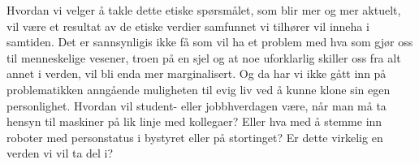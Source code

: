 Hvordan vi velger å takle dette etiske spørsmålet, som blir mer og mer aktuelt, vil være et resultat av de etiske verdier samfunnet vi tilhører vil inneha i samtiden. Det er sannsynligis ikke få som vil ha et problem med hva som gjør oss til menneskelige vesener, troen på en sjel og at noe uforklarlig skiller oss fra alt annet i verden, vil bli enda mer marginalisert. Og da har vi ikke gått inn på problematikken anngående muligheten til evig liv ved å kunne klone sin egen personlighet.
Hvordan vil student- eller jobbhverdagen være, når man må ta hensyn til maskiner på lik linje med kollegaer? Eller hva med å stemme inn roboter med personstatus i bystyret eller på stortinget? Er dette virkelig en verden vi vil ta del i?